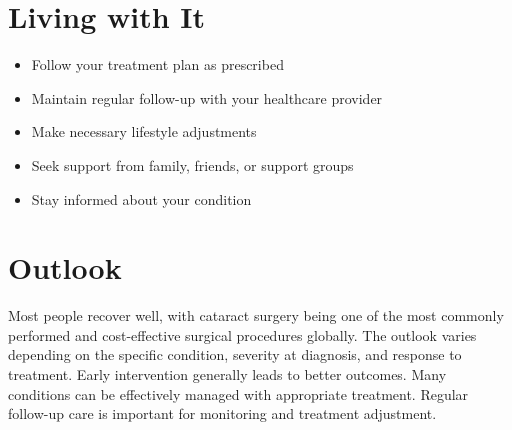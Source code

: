 \section{Living with It}
\begin{itemize}[noitemsep]
  \item Follow your treatment plan as prescribed
  \item Maintain regular follow-up with your healthcare provider
  \item Make necessary lifestyle adjustments
  \item Seek support from family, friends, or support groups
  \item Stay informed about your condition
\end{itemize}
\section{Outlook}
Most people recover well, with cataract surgery being one of the most commonly performed and cost-effective surgical procedures globally. The outlook varies depending on the specific condition, severity at diagnosis, and response to treatment. Early intervention generally leads to better outcomes. Many conditions can be effectively managed with appropriate treatment. Regular follow-up care is important for monitoring and treatment adjustment.
